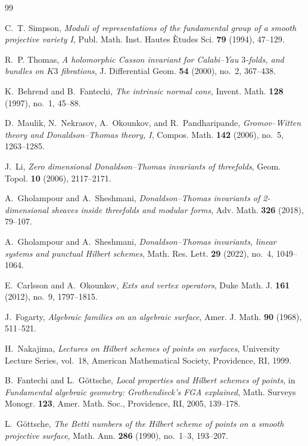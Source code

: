 \documentclass[12pt]{amsart}
\numberwithin{equation}{section}
\theoremstyle{plain}
\theoremstyle{definition}
\theoremstyle{remark}
\begin{document}
\begin{thebibliography}{99}

C.~T. Simpson,
\emph{Moduli of representations of the fundamental group of a smooth projective variety I},
Publ. Math. Inst. Hautes \`Etudes Sci. \textbf{79} (1994), 47--129.

R.~P. Thomas,
\emph{A holomorphic Casson invariant for Calabi--Yau $3$-folds, and bundles on $K3$ fibrations},
J. Differential Geom. \textbf{54} (2000), no.~2, 367--438.

K.~Behrend and B.~Fantechi,
\emph{The intrinsic normal cone},
Invent. Math. \textbf{128} (1997), no.~1, 45--88.

D.~Maulik, N.~Nekrasov, A.~Okounkov, and R.~Pandharipande,
\emph{Gromov--Witten theory and Donaldson--Thomas theory, I},
Compos. Math. \textbf{142} (2006), no.~5, 1263--1285.

J.~Li,
\emph{Zero dimensional Donaldson--Thomas invariants of threefolds},
Geom. Topol. \textbf{10} (2006), 2117--2171.

A.~Gholampour and A.~Sheshmani,
\emph{Donaldson--Thomas invariants of 2-dimensional sheaves inside threefolds and modular forms},
Adv. Math. \textbf{326} (2018), 79--107.

A.~Gholampour and A.~Sheshmani,
\emph{Donaldson--Thomas invariants, linear systems and punctual Hilbert schemes},
Math. Res. Lett. \textbf{29} (2022), no.~4, 1049--1064.

E.~Carlsson and A.~Okounkov,
\emph{Exts and vertex operators},
Duke Math. J. \textbf{161} (2012), no.~9, 1797--1815.

J.~Fogarty,
\emph{Algebraic families on an algebraic surface},
Amer. J. Math. \textbf{90} (1968), 511--521.

H.~Nakajima,
\emph{Lectures on Hilbert schemes of points on surfaces},
University Lecture Series, vol.~18,
American Mathematical Society, Providence, RI, 1999.

B.~Fantechi and L.~G\"ottsche,
\emph{Local properties and Hilbert schemes of points},
in \emph{Fundamental algebraic geometry: Grothendieck's FGA explained},
Math. Surveys Monogr. \textbf{123},
Amer. Math. Soc., Providence, RI, 2005, 139--178.

L.~G\"ottsche,
\emph{The Betti numbers of the Hilbert scheme of points on a smooth projective surface},
Math. Ann. \textbf{286} (1990), no.~1--3, 193--207.


\end{thebibliography}
\end{document}
